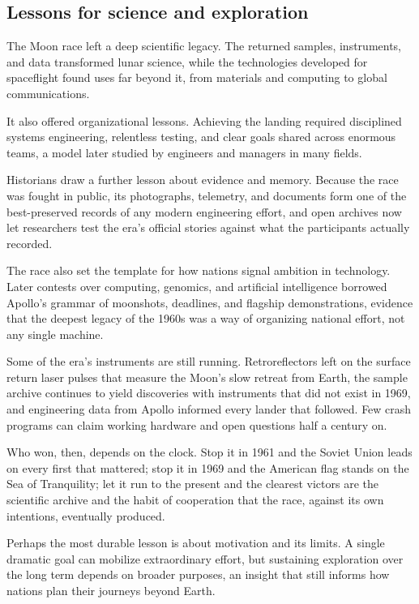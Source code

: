 \subsection{Lessons for science and exploration}
The Moon race left a deep scientific legacy. The returned samples, instruments, and data transformed lunar science, while the technologies developed for spaceflight found uses far beyond it, from materials and computing to global communications.

It also offered organizational lessons. Achieving the landing required disciplined systems engineering, relentless testing, and clear goals shared across enormous teams, a model later studied by engineers and managers in many fields.

Historians draw a further lesson about evidence and memory. Because the race was fought in public, its photographs, telemetry, and documents form one of the best-preserved records of any modern engineering effort, and open archives now let researchers test the era's official stories against what the participants actually recorded.

The race also set the template for how nations signal ambition in technology. Later contests over computing, genomics, and artificial intelligence borrowed Apollo's grammar of moonshots, deadlines, and flagship demonstrations, evidence that the deepest legacy of the 1960s was a way of organizing national effort, not any single machine.

Some of the era's instruments are still running. Retroreflectors left on the surface return laser pulses that measure the Moon's slow retreat from Earth, the sample archive continues to yield discoveries with instruments that did not exist in 1969, and engineering data from Apollo informed every lander that followed. Few crash programs can claim working hardware and open questions half a century on.

Who won, then, depends on the clock. Stop it in 1961 and the Soviet Union leads on every first that mattered; stop it in 1969 and the American flag stands on the Sea of Tranquility; let it run to the present and the clearest victors are the scientific archive and the habit of cooperation that the race, against its own intentions, eventually produced.

Perhaps the most durable lesson is about motivation and its limits. A single dramatic goal can mobilize extraordinary effort, but sustaining exploration over the long term depends on broader purposes, an insight that still informs how nations plan their journeys beyond Earth. \cite{siddiqi2010} \cite{logsdon2010} \cite{chaikin1994} \cite{nasaimages}

